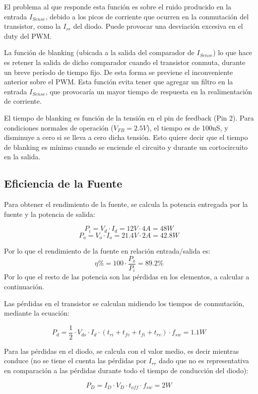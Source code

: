 \documentclass[e4_tp2_main.tex]{subfiles}
\begin{document}
El problema al que responde esta función es sobre el ruido producido en la entrada $I_{Sense}$, debido a los picos de corriente que ocurren en la conmutación del transistor, como la $I_{rr}$ del diodo. Puede provocar una desviación excesiva en el duty del PWM.\par
La función de blanking (ubicada a la salida del comparador de $I_{Sense}$) lo que hace es retener la salida de dicho comparador cuando el transistor conmuta, durante un breve período de tiempo fijo. De esta forma se previene el inconveniente anterior sobre el PWM. Esta función evita tener que agregar un filtro en la entrada $I_{Sense}$, que provocaría un mayor tiempo de respuesta en la realimentación de corriente.\par
El tiempo de blanking es función de la tensión en el pin de feedback (Pin 2). Para condiciones normales de operación ($V_{FB} = 2.5V$), el tiempo es de 100nS, y disminuye a cero si se lleva a cero dicha tensión. Esto quiere decir que el tiempo de blanking es mínimo cuando se enciende el circuito y durante un cortocircuito en la salida. 

\subsection*{Eficiencia de la Fuente}
Para obtener el rendimiento de la fuente, se calcula la potencia entregada por la fuente y la potencia de salida:

\[
P_i = V_d \cdot I_d = 12V \cdot 4A = 48W  
\]
\[
P_o = V_o \cdot I_o = 21.4V \cdot 2A = 42.8W
\]

Por lo que el rendimiento de la fuente en relación entrada/salida es:
\[
\eta \% = 100 \cdot \frac{P_o}{P_i} = 89.2 \%
\]
Por lo que el resto de las potencia son las pérdidas en los elementos, a calcular a continuación.\par

Las pérdidas en el transistor se calculan midiendo los tiempos de conmutación, mediante la ecuación:

\[
P_d = \frac{1}{2} \cdot V_{ds} \cdot I_d \cdot (t_{ri} + t_{fv} + t_{fi} + t_{rv}) \cdot f_{sw} = 1.1W
\]

Para las pérdidas en el diodo, se calcula con el valor medio, es decir mientras conduce (no se tiene el cuenta las pérdidas por $I_{rr}$ dado que no es representativa en comparación a las pérdidas durante todo el tiempo de conducción del diodo):

\[
P_D = I_D \cdot V_D \cdot t_{off} \cdot f_{sw} = 2W
\]
\end{document}
